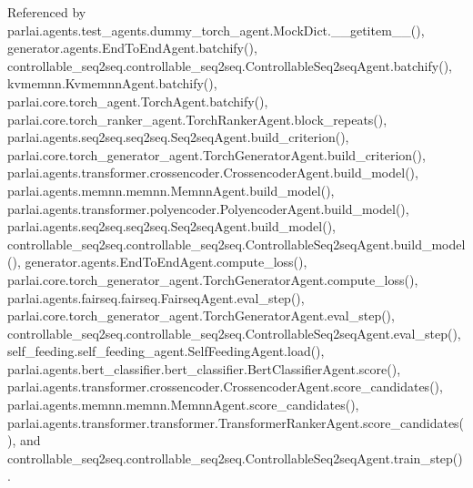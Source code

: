 Referenced by parlai.\+agents.\+test\+\_\+agents.\+dummy\+\_\+torch\+\_\+agent.\+Mock\+Dict.\+\_\+\+\_\+getitem\+\_\+\+\_\+(), generator.\+agents.\+End\+To\+End\+Agent.\+batchify(), controllable\+\_\+seq2seq.\+controllable\+\_\+seq2seq.\+Controllable\+Seq2seq\+Agent.\+batchify(), kvmemnn.\+Kvmemnn\+Agent.\+batchify(), parlai.\+core.\+torch\+\_\+agent.\+Torch\+Agent.\+batchify(), parlai.\+core.\+torch\+\_\+ranker\+\_\+agent.\+Torch\+Ranker\+Agent.\+block\+\_\+repeats(), parlai.\+agents.\+seq2seq.\+seq2seq.\+Seq2seq\+Agent.\+build\+\_\+criterion(), parlai.\+core.\+torch\+\_\+generator\+\_\+agent.\+Torch\+Generator\+Agent.\+build\+\_\+criterion(), parlai.\+agents.\+transformer.\+crossencoder.\+Crossencoder\+Agent.\+build\+\_\+model(), parlai.\+agents.\+memnn.\+memnn.\+Memnn\+Agent.\+build\+\_\+model(), parlai.\+agents.\+transformer.\+polyencoder.\+Polyencoder\+Agent.\+build\+\_\+model(), parlai.\+agents.\+seq2seq.\+seq2seq.\+Seq2seq\+Agent.\+build\+\_\+model(), controllable\+\_\+seq2seq.\+controllable\+\_\+seq2seq.\+Controllable\+Seq2seq\+Agent.\+build\+\_\+model(), generator.\+agents.\+End\+To\+End\+Agent.\+compute\+\_\+loss(), parlai.\+core.\+torch\+\_\+generator\+\_\+agent.\+Torch\+Generator\+Agent.\+compute\+\_\+loss(), parlai.\+agents.\+fairseq.\+fairseq.\+Fairseq\+Agent.\+eval\+\_\+step(), parlai.\+core.\+torch\+\_\+generator\+\_\+agent.\+Torch\+Generator\+Agent.\+eval\+\_\+step(), controllable\+\_\+seq2seq.\+controllable\+\_\+seq2seq.\+Controllable\+Seq2seq\+Agent.\+eval\+\_\+step(), self\+\_\+feeding.\+self\+\_\+feeding\+\_\+agent.\+Self\+Feeding\+Agent.\+load(), parlai.\+agents.\+bert\+\_\+classifier.\+bert\+\_\+classifier.\+Bert\+Classifier\+Agent.\+score(), parlai.\+agents.\+transformer.\+crossencoder.\+Crossencoder\+Agent.\+score\+\_\+candidates(), parlai.\+agents.\+memnn.\+memnn.\+Memnn\+Agent.\+score\+\_\+candidates(), parlai.\+agents.\+transformer.\+transformer.\+Transformer\+Ranker\+Agent.\+score\+\_\+candidates(), and controllable\+\_\+seq2seq.\+controllable\+\_\+seq2seq.\+Controllable\+Seq2seq\+Agent.\+train\+\_\+step().

\mbox{\label{classparlai_1_1agents_1_1test__agents_1_1dummy__torch__agent_1_1MockDict_a4b03100cbac5243127652e25e65e258f}} 
